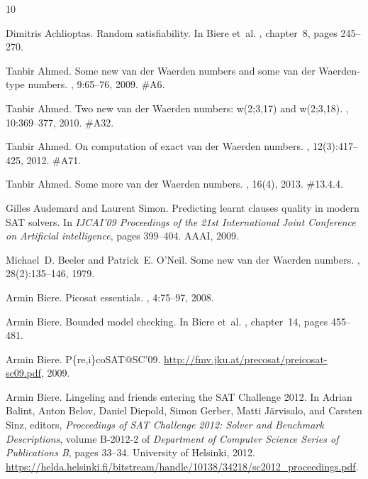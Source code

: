 \documentclass[final,3p,times]{elsarticle}
\theoremstyle{definition}
\begin{document}


\begin{thebibliography}{10}

Dimitris Achlioptas.
\newblock Random satisfiability.
\newblock In Biere et~al. \cite{2008HandbuchSAT}, chapter~8, pages 245--270.

Tanbir Ahmed.
\newblock Some new van der {W}aerden numbers and some van der {W}aerden-type
  numbers.
, 9:65--76, 2009.
\newblock \#{}A6.

Tanbir Ahmed.
\newblock Two new van der {W}aerden numbers: w(2;3,17) and w(2;3,18).
, 10:369--377, 2010.
\newblock \#{}A32.

Tanbir Ahmed.
\newblock On computation of exact van der {W}aerden numbers.
, 12(3):417--425, 2012.
\newblock \#{}A71.

Tanbir Ahmed.
\newblock Some more van der {W}aerden numbers.
, 16(4), 2013.
\newblock \#{}13.4.4.

Gilles Audemard and Laurent Simon.
\newblock Predicting learnt clauses quality in modern {SAT} solvers.
\newblock In {\em IJCAI'09 Proceedings of the 21st International Joint
  Conference on Artificial intelligence}, pages 399--404. AAAI, 2009.

Michael~D. Beeler and Patrick~E. O'Neil.
\newblock Some new van der {W}aerden numbers.
, 28(2):135--146, 1979.

Armin Biere.
\newblock Picosat essentials.
,
  4:75--97, 2008.

Armin Biere.
\newblock Bounded model checking.
\newblock In Biere et~al. \cite{2008HandbuchSAT}, chapter~14, pages 455--481.

Armin Biere.
\newblock P\{re,i\}co{SAT}@{SC}'09.
\newblock \url{http://fmv.jku.at/precosat/preicosat-sc09.pdf}, 2009.

Armin Biere.
\newblock Lingeling and friends entering the {SAT} {C}hallenge 2012.
\newblock In Adrian Balint, Anton Belov, Daniel Diepold, Simon Gerber, Matti
  J\"{a}rvisalo, and Carsten Sinz, editors, {\em Proceedings of {SAT} Challenge
  2012: Solver and Benchmark Descriptions}, volume B-2012-2 of {\em Department
  of Computer Science Series of Publications B}, pages 33--34. University of
  Helsinki, 2012.
\newblock
  \url{https://helda.helsinki.fi/bitstream/handle/10138/34218/sc2012_proceedings.pdf}.


\end{thebibliography}
\end{document}
